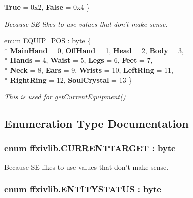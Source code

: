 \begin{DoxyCompactItemize}
{\bfseries True} = 0x2, 
{\bfseries False} = 0x4
 \}
\begin{DoxyCompactList}\small\item\em Because S\-E likes to use values that don't make sense. \end{DoxyCompactList}\item 
enum \hyperlink{namespaceffxivlib_a08bcc753fec0a3174d818ecaa25aec4f}{E\-Q\-U\-I\-P\-\_\-\-P\-O\-S} \-: byte \{ \\*
{\bfseries Main\-Hand} = 0, 
{\bfseries Off\-Hand} = 1, 
{\bfseries Head} = 2, 
{\bfseries Body} = 3, 
\\*
{\bfseries Hands} = 4, 
{\bfseries Waist} = 5, 
{\bfseries Legs} = 6, 
{\bfseries Feet} = 7, 
\\*
{\bfseries Neck} = 8, 
{\bfseries Ears} = 9, 
{\bfseries Wrists} = 10, 
{\bfseries Left\-Ring} = 11, 
\\*
{\bfseries Right\-Ring} = 12, 
{\bfseries Soul\-Crystal} = 13
 \}
\begin{DoxyCompactList}\small\item\em This is used for get\-Current\-Equipment() \end{DoxyCompactList}\end{DoxyCompactItemize}


\subsection{Enumeration Type Documentation}
\hypertarget{namespaceffxivlib_a027fd426531e3a42243f5c2b946dde31}{
\subsubsection[{C\-U\-R\-R\-E\-N\-T\-T\-A\-R\-G\-E\-T}]{\setlength{\rightskip}{0pt plus 5cm}enum {\bf ffxivlib.\-C\-U\-R\-R\-E\-N\-T\-T\-A\-R\-G\-E\-T} \-: byte}}\label{namespaceffxivlib_a027fd426531e3a42243f5c2b946dde31}


Because S\-E likes to use values that don't make sense. 

\hypertarget{namespaceffxivlib_a93f054414b7ccf7ba7c36f54fcc392f5}{
\subsubsection[{E\-N\-T\-I\-T\-Y\-S\-T\-A\-T\-U\-S}]{\setlength{\rightskip}{0pt plus 5cm}enum {\bf ffxivlib.\-E\-N\-T\-I\-T\-Y\-S\-T\-A\-T\-U\-S} \-: byte}}\label{namespaceffxivlib_a93f054414b7ccf7ba7c36f54fcc392f5}


